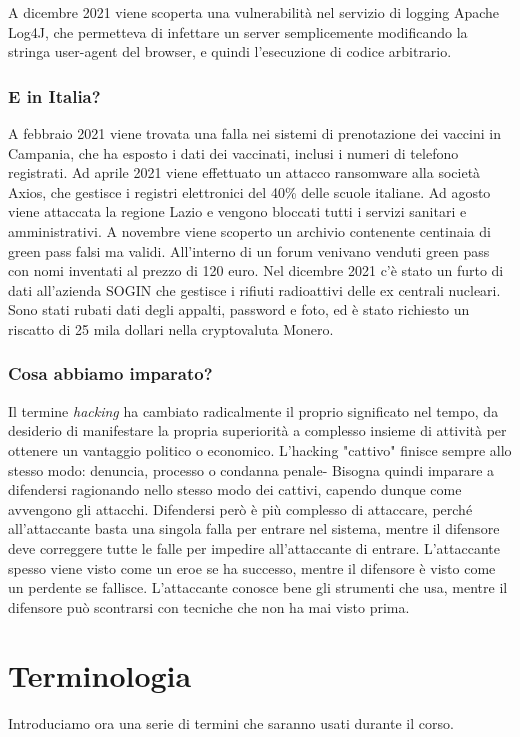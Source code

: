 A dicembre 2021 viene scoperta una vulnerabilità nel servizio di logging Apache Log4J, che permetteva di infettare un server semplicemente modificando la stringa user-agent del browser, e quindi l'esecuzione di codice arbitrario.

\subsubsection{E in Italia?}
A febbraio 2021 viene trovata una falla nei sistemi di prenotazione dei vaccini in Campania, che ha esposto i dati dei vaccinati, inclusi i numeri di telefono registrati. Ad aprile 2021 viene effettuato un attacco ransomware alla società Axios, che gestisce i registri elettronici del 40\% delle scuole italiane. Ad agosto viene attaccata la regione Lazio e vengono bloccati tutti i servizi sanitari e amministrativi. A novembre viene scoperto un archivio contenente centinaia di green pass falsi ma validi. All'interno di un forum venivano venduti green pass con nomi inventati al prezzo di 120 euro. Nel dicembre 2021 c'è stato un furto di dati all'azienda SOGIN che gestisce i rifiuti radioattivi delle ex centrali nucleari. Sono stati rubati dati degli appalti, password e foto, ed è stato richiesto un riscatto di 25 mila dollari nella cryptovaluta Monero.

\subsubsection{Cosa abbiamo imparato?}
Il termine \textit{hacking} ha cambiato radicalmente il proprio significato nel tempo, da desiderio di manifestare la propria superiorità a complesso insieme di attività per ottenere un vantaggio politico o economico. L'hacking "cattivo" finisce sempre allo stesso modo: denuncia, processo o condanna penale- Bisogna quindi imparare a difendersi ragionando nello stesso modo dei cattivi, capendo dunque come avvengono gli attacchi. Difendersi però è più complesso di attaccare, perché all'attaccante basta una singola falla per entrare nel sistema, mentre il difensore deve correggere tutte le falle per impedire all'attaccante di entrare. L'attaccante spesso viene visto come un eroe se ha successo, mentre il difensore è visto come un perdente se fallisce. L'attaccante conosce bene gli strumenti che usa, mentre il difensore può scontrarsi con tecniche che non ha mai visto prima. 

\section{Terminologia}
Introduciamo ora una serie di termini che saranno usati durante il corso.


